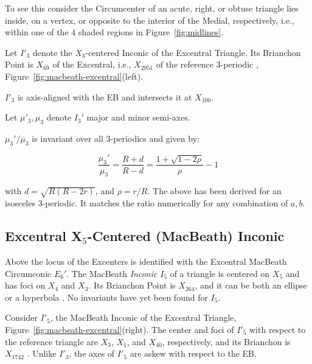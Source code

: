 To see this consider the Circumcenter of an acute, right, or obtuse triangle lies inside, on a vertex, or opposite to the interior of the Medial, respectively, i.e., within one of the 4 shaded regions in Figure~\ref{fig:midlines}.

Let $I'_3$ denote the $X_3$-centered Inconic of the Excentral Triangle. Its Brianchon Point is $X_{69}$ of the Excentral, i.e., $X_{2951}$ of the reference 3-periodic \cite{moses2020-private-circumconic}, Figure~\ref{fig:macbeath-excentral}(left).

\begin{remark}
$I'_3$ is axis-aligned with the EB and intersects it at $X_{100}$.
\end{remark}

\noindent Let $\mu'_3,\mu_3$ denote $I_3'$ major and minor semi-axes.

\begin{conjecture}
$\mu_3'/\mu_3$ is invariant over all 3-periodics and given by:

\begin{equation*}
\frac{\mu_3'}{\mu_3}=
\frac{R+d}{R-d} = \frac{1+\sqrt{1-2\rho}}{\rho}-1
\end{equation*}
\label{conj:excIncX3}
\end{conjecture}

\noindent with $d=\sqrt{R(R-2r)}$, and $\rho=r/R$. The above has been derived for an isosceles 3-periodic. It matches the ratio numerically for any combination of $a,b$.

\subsection{Excentral  X$_5$-Centered (MacBeath) Inconic}

Above the locus of the Excenters is identified with the Excentral MacBeath Circumconic $E_6' $. The MacBeath {\em Inconic} $I_5$ of a triangle is centered on $X_5$ and has foci on $X_4$ and $X_3$. Its Brianchon Point is $X_{264}$, and it can be both an ellipse or a hyperbola \cite[MacBeath Inconic]{mw}. No invariants have yet been found for $I_5$.

Consider $I'_5$, the MacBeath Inconic of the Excentral Triangle, Figure~\ref{fig:macbeath-excentral}(right). The center and foci of $I'_5$ with respect to the reference triangle are $X_3$, $X_1$, and $X_{40}$, respectively, and its Brianchon is $X_{1742}$ \cite{moses2020-private-circumconic}. Unlike $I'_3$, the axes of $I'_5$ are askew with respect to the EB.

